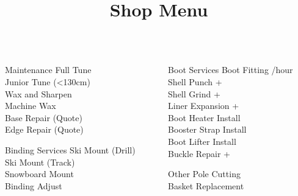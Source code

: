 \documentclass{beamer}
\title{Shop Menu}
\begin{document}
  \begin{frame}[fragile]\centering
    \begin{columns}[T]
        \begin{column}{0.45\textwidth}
            \begin{block}{Maintenance}
                Full Tune \hfill {}\\
                Junior Tune (<130cm) \hfill {}\\
                Wax and Sharpen \hfill {}\\
                Machine Wax \hfill{}\\
                Base Repair \hfill(Quote) \\
                Edge Repair \hfill (Quote)
            \end{block}
             \begin{block}{Binding Services}
                Ski Mount (Drill) \hfill {}\\
                Ski Mount (Track) \hfill {}\\
                Snowboard Mount \hfill {}\\
                Binding Adjust \hfill {}
            \end{block} 
        \end{column}
        \begin{column}{0.45\textwidth}
            \begin{block}{Boot Services}
                Boot Fitting \hfill {}/hour\\
                Shell Punch \hfill {}+\\
                Shell Grind \hfill {}+\\
                Liner Expansion \hfill {}+\\
                Boot Heater Install \hfill {}\\
                Booster Strap Install \hfill {}\\
                Boot Lifter Install \hfill {}\\
                Buckle Repair \hfill {}+\\
            \end{block} 
            \begin{block}{Other}
                Pole Cutting \hfill {}\\
                Basket Replacement \hfill {}\\
            \end{block}

        \end{column}
    \end{columns}
  \end{frame}
\end{document}
